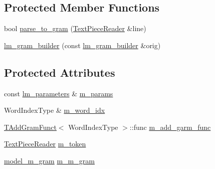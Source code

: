 \subsection*{Protected Member Functions}
\begin{DoxyCompactItemize}
\item 
bool \hyperlink{classuva_1_1smt_1_1bpbd_1_1server_1_1lm_1_1arpa_1_1lm__gram__builder_a60a2a63f62110774bedad98574b5b3d6}{parse\+\_\+to\+\_\+gram} (\hyperlink{classuva_1_1utils_1_1file_1_1_text_piece_reader}{Text\+Piece\+Reader} \&line)
\item 
\hyperlink{classuva_1_1smt_1_1bpbd_1_1server_1_1lm_1_1arpa_1_1lm__gram__builder_a94dd63c1c1737c5bb40b2277c72270bc}{lm\+\_\+gram\+\_\+builder} (const \hyperlink{classuva_1_1smt_1_1bpbd_1_1server_1_1lm_1_1arpa_1_1lm__gram__builder}{lm\+\_\+gram\+\_\+builder} \&orig)
\end{DoxyCompactItemize}
\subsection*{Protected Attributes}
\begin{DoxyCompactItemize}
\item 
const \hyperlink{structuva_1_1smt_1_1bpbd_1_1server_1_1lm_1_1lm__parameters}{lm\+\_\+parameters} \& \hyperlink{classuva_1_1smt_1_1bpbd_1_1server_1_1lm_1_1arpa_1_1lm__gram__builder_ae9e727cf174b8d61d1e9f88ac30a50e5}{m\+\_\+params}
\item 
Word\+Index\+Type \& \hyperlink{classuva_1_1smt_1_1bpbd_1_1server_1_1lm_1_1arpa_1_1lm__gram__builder_af9cf5c614babb6928aaec282d2a8eb94}{m\+\_\+word\+\_\+idx}
\item 
\hyperlink{structuva_1_1smt_1_1bpbd_1_1server_1_1lm_1_1arpa_1_1_t_add_gram_funct}{T\+Add\+Gram\+Funct}$<$ Word\+Index\+Type $>$\+::func \hyperlink{classuva_1_1smt_1_1bpbd_1_1server_1_1lm_1_1arpa_1_1lm__gram__builder_a9773e2b8af83ad5744bc9efbf3726770}{m\+\_\+add\+\_\+garm\+\_\+func}
\item 
\hyperlink{classuva_1_1utils_1_1file_1_1_text_piece_reader}{Text\+Piece\+Reader} \hyperlink{classuva_1_1smt_1_1bpbd_1_1server_1_1lm_1_1arpa_1_1lm__gram__builder_a0b061a84fbff441f27cb19a01d51a127}{m\+\_\+token}
\item 
\hyperlink{classuva_1_1smt_1_1bpbd_1_1server_1_1lm_1_1m__grams_1_1model__m__gram}{model\+\_\+m\+\_\+gram} \hyperlink{classuva_1_1smt_1_1bpbd_1_1server_1_1lm_1_1arpa_1_1lm__gram__builder_a2b1b788450d31a1f2f0a6e89c28c6a1f}{m\+\_\+m\+\_\+gram}
\end{DoxyCompactItemize}
